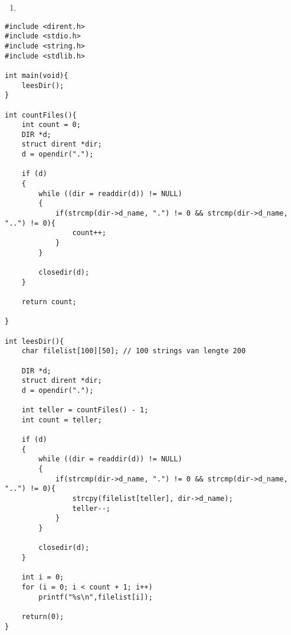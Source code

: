 \begin{enumerate}
  \item 
\end{enumerate}

\begin{lstlisting}
#include <dirent.h>
#include <stdio.h>
#include <string.h>
#include <stdlib.h>

int main(void){
	leesDir();
}

int countFiles(){
	int count = 0;
	DIR *d;
	struct dirent *dir;
	d = opendir(".");

	if (d)
	{
		while ((dir = readdir(d)) != NULL)
		{
			if(strcmp(dir->d_name, ".") != 0 && strcmp(dir->d_name, "..") != 0){
				count++;
			}
		}

		closedir(d);
	}

	return count;

}

int leesDir(){
	char filelist[100][50]; // 100 strings van lengte 200

	DIR *d;
	struct dirent *dir;
	d = opendir(".");

	int teller = countFiles() - 1;
	int count = teller;

	if (d)
	{
		while ((dir = readdir(d)) != NULL)
		{
			if(strcmp(dir->d_name, ".") != 0 && strcmp(dir->d_name, "..") != 0){
				strcpy(filelist[teller], dir->d_name);
				teller--;
			}
		}

		closedir(d);
	}

	int i = 0;
	for (i = 0; i < count + 1; i++)
		printf("%s\n",filelist[i]);

	return(0);
}
\end{lstlisting}